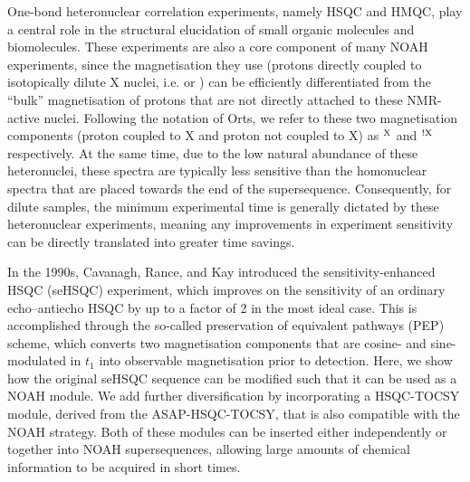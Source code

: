 \documentclass[11pt]{article}
\newcommand*{\carbon}{\ce{^{13}C}}
\newcommand*{\nitrogen}{\ce{^{15}N}}
\newcommand*{\magn}[1]{\ce{^1H}$^{#1}$}
\newcommand*{\magnnot}[1]{\ce{^1H}$^{!#1}$}
\begin{document}
One-bond heteronuclear correlation experiments, namely HSQC and HMQC, play a central role in the structural elucidation of small organic molecules and biomolecules.\autocite{textbooks}
These experiments are also a core component of many NOAH experiments, since the magnetisation they use (protons directly coupled to isotopically dilute X nuclei, i.e. \carbon{} or \nitrogen{}) can be efficiently differentiated from the ``bulk'' magnetisation of protons that are not directly attached to these NMR-active nuclei.\autocite{Garbow1982CPL, Kupce2019JMR}
Following the notation of Orts,\autocite{Orts2018M} we refer to these two magnetisation components (proton coupled to X and proton not coupled to X) as \magn{\ce{X}} and \magnnot{\ce{X}} respectively.
At the same time, due to the low natural abundance of these heteronuclei, these spectra are typically less sensitive than the homonuclear spectra that are placed towards the end of the supersequence.
Consequently, for dilute samples, the minimum experimental time is generally dictated by these heteronuclear experiments, meaning any improvements in experiment sensitivity can be directly translated into greater time savings.

In the 1990s, Cavanagh, Rance, and Kay introduced the sensitivity-enhanced HSQC (seHSQC) experiment,\autocite{sehsqc} which improves on the sensitivity of an ordinary echo--antiecho HSQC by up to a factor of 2 in the most ideal case.
This is accomplished through the so-called preservation of equivalent pathways (PEP) scheme, which converts two magnetisation components that are cosine- and sine-modulated in $t_1$ into observable magnetisation prior to detection.
Here, we show how the original seHSQC sequence can be modified such that it can be used as a NOAH module.
We add further diversification by incorporating a HSQC-TOCSY module, derived from the ASAP-HSQC-TOCSY,\autocite{Becker2019JMR} that is also compatible with the NOAH strategy.
Both of these modules can be inserted either independently or together into NOAH supersequences, allowing large amounts of chemical information to be acquired in short times.


\end{document}

